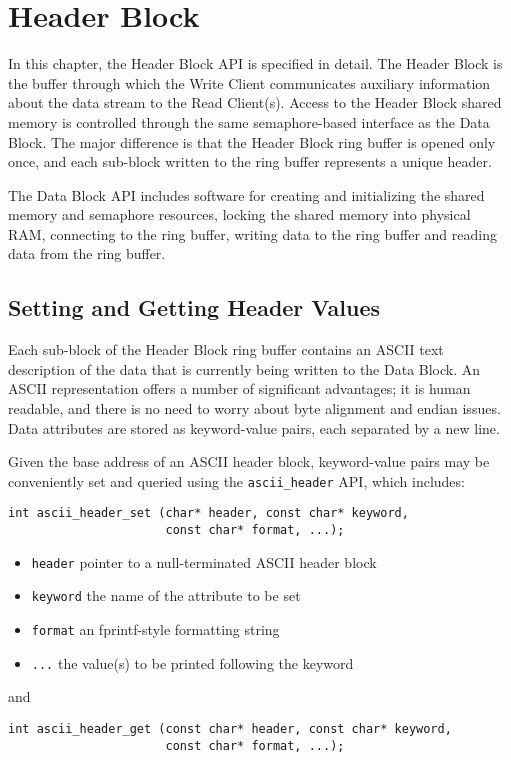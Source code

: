 \chapter{Header Block}
\label{ch:header}

In this chapter, the Header Block API is specified in detail.  The
Header Block is the buffer through which the Write Client communicates
auxiliary information about the data stream to the Read Client(s).
Access to the Header Block shared memory is controlled through the
same semaphore-based interface as the Data Block.  The major difference
is that the Header Block ring buffer is opened only once, and each
sub-block written to the ring buffer represents a unique header.

The Data Block API includes software for creating and initializing the
shared memory and semaphore resources, locking the shared memory into
physical RAM, connecting to the ring buffer, writing data to the ring
buffer and reading data from the ring buffer.

\section{Setting and Getting Header Values}

Each sub-block of the Header Block ring buffer contains an ASCII text
description of the data that is currently being written to the Data
Block.  An ASCII representation offers a number of significant
advantages; it is human readable, and there is no need to worry about
byte alignment and endian issues.  Data attributes are stored as
keyword-value pairs, each separated by a new line.

Given the base address of an ASCII header block, keyword-value pairs
may be conveniently set and queried using the {\tt ascii\_header} API,
which includes:
\begin{verbatim}
int ascii_header_set (char* header, const char* keyword,
                      const char* format, ...);
\end{verbatim}

\begin{itemize}
\item {\tt header} pointer to a null-terminated ASCII header block

\item {\tt keyword} the name of the attribute to be set

\item {\tt format} an fprintf-style formatting string

\item {\tt ...} the value(s) to be printed following the keyword
\end{itemize}
and
\begin{verbatim}
int ascii_header_get (const char* header, const char* keyword,
                      const char* format, ...);
\end{verbatim}

